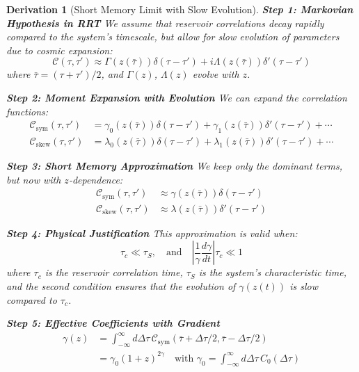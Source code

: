 \documentclass[10pt, a4paper]{article}
\newtheorem{derivation}{Derivation}
\begin{document}
\begin{derivation}[Short Memory Limit with Slow Evolution]
\textbf{Step 1: Markovian Hypothesis in RRT}
We assume that reservoir correlations decay rapidly compared to the system's timescale, but allow for slow evolution of parameters due to cosmic expansion:
\begin{equation}
\mathcal{C}(\tau, \tau') \approx \Gamma(z(\bar{\tau})) \delta(\tau-\tau') + i\Lambda(z(\bar{\tau})) \delta'(\tau-\tau')
\tag{24.1}
\end{equation}
where $\bar{\tau} = (\tau+\tau')/2$, and $\Gamma(z)$, $\Lambda(z)$ evolve with $z$.

\textbf{Step 2: Moment Expansion with Evolution}
We can expand the correlation functions:
\begin{align}
\mathcal{C}_{\text{sym}}(\tau,\tau') &= \gamma_0(z(\bar{\tau})) \delta(\tau-\tau') + \gamma_1(z(\bar{\tau})) \delta'(\tau-\tau') + \cdots
\tag{24.2} \\
\mathcal{C}_{\text{skew}}(\tau,\tau') &= \lambda_0(z(\bar{\tau})) \delta(\tau-\tau') + \lambda_1(z(\bar{\tau})) \delta'(\tau-\tau') + \cdots
\tag{24.3}
\end{align}

\textbf{Step 3: Short Memory Approximation}
We keep only the dominant terms, but now with $z$-dependence:
\begin{align}
\mathcal{C}_{\text{sym}}(\tau,\tau') &\approx \gamma(z(\bar{\tau})) \delta(\tau-\tau')
\tag{24.4} \\
\mathcal{C}_{\text{skew}}(\tau,\tau') &\approx \lambda(z(\bar{\tau})) \delta'(\tau-\tau')
\tag{24.5}
\end{align}

\textbf{Step 4: Physical Justification}
This approximation is valid when:
\begin{equation}
\tau_c \ll \tau_S, \quad \text{and} \quad \left|\frac{1}{\gamma}\frac{d\gamma}{dt}\right| \tau_c \ll 1
\tag{24.6}
\end{equation}
where $\tau_c$ is the reservoir correlation time, $\tau_S$ is the system's characteristic time, and the second condition ensures that the evolution of $\gamma(z(t))$ is slow compared to $\tau_c$.

\textbf{Step 5: Effective Coefficients with Gradient}
\begin{align}
\gamma(z) &= \int_{-\infty}^{\infty} d\Delta\tau \, \mathcal{C}_{\text{sym}}(\bar{\tau}+\Delta\tau/2, \bar{\tau}-\Delta\tau/2) \\
&= \gamma_0 (1+z)^{2\gamma} \quad \text{with } \gamma_0 = \int_{-\infty}^{\infty} d\Delta\tau \, C_0(\Delta\tau)
\tag{24.7}
\end{align}


\end{derivation}
\end{document}
